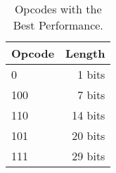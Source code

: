 \begin{table}
	\centering
	\begin{tabular}{lr}
		Opcode & Length \\
		\hline
		0 & 1 bits \\
		100 & 7 bits \\
		110 & 14 bits \\
		101 & 20 bits \\
		111 & 29 bits
	\end{tabular}
		

	\caption{Opcodes with the Best Performance.}
	\label{tab:results-opcode-decodeTable}
\end{table}